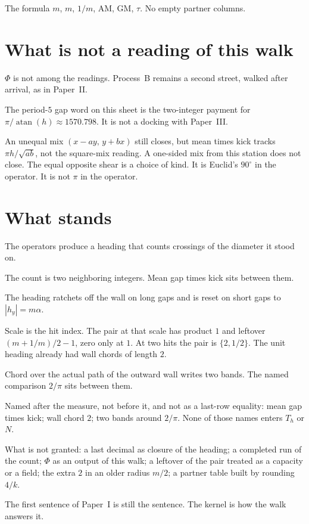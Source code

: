 \documentclass[10pt,a4paper]{article}
\theoremstyle{plain}
\theoremstyle{definition}
\theoremstyle{remark}
\begin{document}
The formula \(m\), \(m\), \(1/m\), AM, GM, \(\tau\).
No empty partner columns.

\section{What is not a reading of this walk}

\(\Phi\) is not among the readings.
Process~B remains a second street, walked after arrival, as in Paper~II.

The period-\(5\) gap word on this sheet is the two-integer payment for \(\pi/\operatorname{atan}(h)\approx 1570.798\).
It is not a docking with Paper~III.

An unequal mix \((x-ay,\,y+bx)\) still closes, but mean times kick tracks \(\pi h/\sqrt{ab}\), not the square-mix reading.
A one-sided mix from this station does not close.
The equal opposite shear is a choice of kind.
It is Euclid's \(90^\circ\) in the operator.
It is not \(\pi\) in the operator.

\section{What stands}

The operators produce a heading that counts crossings of the diameter it stood on.

The count is two neighboring integers.
Mean gap times kick sits between them.

The heading ratchets off the wall on long gaps and is reset on short gaps to \(|h_y|=m\alpha\).

Scale is the hit index.
The pair at that scale has product \(1\) and leftover \((m+1/m)/2-1\), zero only at \(1\).
At two hits the pair is \(\{2,1/2\}\).
The unit heading already had wall chords of length \(2\).

Chord over the actual path of the outward wall writes two bands.
The named comparison \(2/\pi\) sits between them.

Named after the measure, not before it, and not as a last-row equality:
mean gap times kick; wall chord \(2\); two bands around \(2/\pi\).
None of those names enters \(T_h\) or \(N\).

What is not granted: a last decimal as closure of the heading; a completed run of the count; \(\Phi\) as an output of this walk; a leftover of the pair treated as a capacity or a field; the extra \(2\) in an older radius \(m/2\); a partner table built by rounding \(4/k\).

The first sentence of Paper~I is still the sentence.
The kernel is how the walk answers it.
\end{document}
